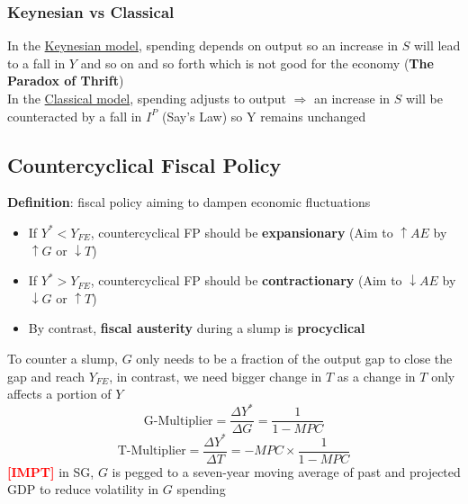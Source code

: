 \documentclass{article}
\newcommand{\impt}[0]{\textcolor{red}{\textbf{[IMPT] }}}
\begin{document}
\begin{multicols}{2}
\subsubsection{Keynesian vs Classical}
In the \underline{Keynesian model}, spending depends on output so an increase in $S$ will lead to a fall in $Y$ and so on and so forth which is not good for the economy (\textbf{The Paradox of Thrift})\\
In the \underline{Classical model}, spending adjusts to output $\Rightarrow$ an increase in $S$ will be counteracted by a fall in $I^P$ (Say's Law) so Y remains unchanged

\subsection{Countercyclical Fiscal Policy}
\textbf{Definition}: fiscal policy aiming to dampen economic fluctuations
\begin{itemize}
	\item If $Y^* < Y_{FE}$, countercyclical FP should be \textbf{expansionary} (Aim to $\uparrow AE$ by $\uparrow G$ or $\downarrow T$)
	\item If $Y^* > Y_{FE}$, countercyclical FP should be \textbf{contractionary} (Aim to $\downarrow AE$ by $\downarrow G$ or $\uparrow T$)
	\item By contrast, \textbf{fiscal austerity} during a slump is \textbf{procyclical}
\end{itemize}
To counter a slump, $G$ only needs to be a fraction of the output gap to close the gap and reach $Y_{FE}$, in contrast, we need bigger change in $T$ as a change in $T$ only affects a portion of $Y$
$$\text{G-Multiplier} = \frac{\Delta Y^*}{\Delta G} = \frac{1}{1-MPC}$$
$$\text{T-Multiplier} = \frac{\Delta Y^*}{\Delta T} = -MPC \times \frac{1}{1-MPC}$$
\impt in SG, $G$ is pegged to a seven-year moving average of past and projected GDP to reduce volatility in $G$ spending

\end{multicols}
\end{document}
